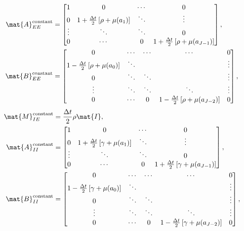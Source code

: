 \documentclass{jpmarticle}
\begin{document}
\begin{equation}
  \begin{split}
    \mat{A}_{EE}^{\text{constant}} &=
    \begin{bmatrix}
      1 & 0 & \cdots & 0
      \\
      0 & 1 + \frac{\Delta t}{2} \left[\rho + \mu(a_1)\right] &
      \ddots & \vdots
      \\
      \vdots & \ddots & \ddots & 0
      \\
      0 & \cdots & 0 &
      1 + \frac{\Delta t}{2} \left[\rho + \mu(a_{J - 1})\right]
    \end{bmatrix},
    \\
    \mat{B}_{EE}^{\text{constant}} &=
    \begin{bmatrix}
      0 & \cdots & \cdots & \cdots & 0
      \\
      1 - \frac{\Delta t}{2} \left[\rho + \mu(a_0)\right] & \ddots &
      & & \vdots
      \\
      0 & \ddots & \ddots & & \vdots
      \\
      \vdots & \ddots & \ddots & \ddots & \vdots
      \\
      0 & \cdots & 0 &
      1 - \frac{\Delta t}{2} \left[\rho + \mu(a_{J - 2})\right] & 0
    \end{bmatrix},
  \end{split}
\end{equation}
\begin{equation}
  \begin{split}
    \mat{M}_{IE}^{\text{constant}} &=
    \frac{\Delta t}{2} \rho \mat{I},
    \\
    \mat{A}_{II}^{\text{constant}} &=
    \begin{bmatrix}
      1 & 0 & \cdots & 0
      \\
      0 & 1 + \frac{\Delta t}{2} \left[\gamma + \mu(a_1)\right] &
      \ddots & \vdots
      \\
      \vdots & \ddots & \ddots & 0
      \\
      0 & \cdots & 0 &
      1 + \frac{\Delta t}{2} \left[\gamma + \mu(a_{J - 1})\right]
    \end{bmatrix},
    \\
    \mat{B}_{II}^{\text{constant}} &=
    \begin{bmatrix}
      0 & \cdots & \cdots & \cdots & 0
      \\
      1 - \frac{\Delta t}{2} \left[\gamma + \mu(a_0)\right] & \ddots &
      & & \vdots
      \\
      0 & \ddots & \ddots & & \vdots
      \\
      \vdots & \ddots & \ddots & \ddots & \vdots
      \\
      0 & \cdots & 0 &
      1 - \frac{\Delta t}{2} \left[\gamma + \mu(a_{J - 2})\right] & 0
    \end{bmatrix},
  \end{split}
\end{equation}
\end{document}
